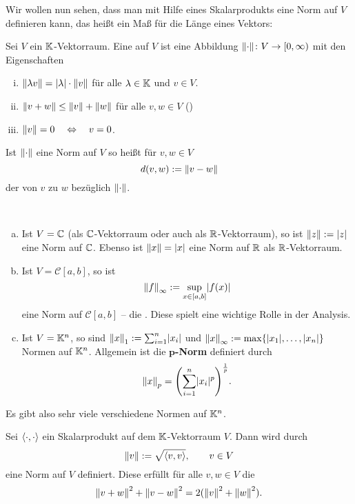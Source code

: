 Wir wollen nun sehen, dass man mit Hilfe eines Skalarprodukts eine Norm auf $V$ definieren kann, das heißt ein Maß für die Länge eines Vektors:

\begin{definition}[Norm]
	\label{def:3.5}
	Sei $V$ ein $\mathbb{K}$-Vektorraum.
	Eine  auf $V$ ist eine Abbildung $\lVert\cdot\rVert \colon V \rightarrow [0,\infty)$	mit den Eigenschaften
	\begin{enumerate}[(i)]
		\item $\left\lVert\lambda v\right\rVert = \lvert\lambda\rvert \cdot \left\lVert v\right\rVert$ für alle $\lambda \in \mathbb{K}$ und $v \in V$.
		\item $\left\lVert v+w\right\rVert \leq \left\lVert v\right\rVert + \left\lVert w\right\rVert$ für alle $v,w \in V$ ()
		\item $\left\lVert v\right\rVert = 0 \quad \Leftrightarrow \quad v = 0$.
	\end{enumerate}
	\newpage
	Ist $\left\lVert\cdot\right\rVert$ eine Norm auf $V$ so heißt für $v,w \in V$
	\[
		d(v,w) := \left\lVert v-w\right\rVert
	\]
	der  von $v$ zu $w$ bezüglich $\left\lVert\cdot\right\rVert$.
\end{definition}

\begin{beispiel}
	\label{bsp:3.6}
	\mbox{} \\[-1.4cm]
	\begin{enumerate}[(a)]
		\item Ist $V = \mathbb{C}$ (als $\mathbb{C}$-Vektorraum oder auch als $\mathbb{R}$-Vektorraum), so ist $\left\lVert z\right\rVert := \lvert z\rvert$ eine Norm auf $\mathbb{C}$.
		Ebenso ist $\left\lVert x\right\rVert = \lvert x\rvert$ eine Norm auf $\mathbb{R}$ als $\mathbb{R}$-Vektorraum.
		\item Ist $V = \mathcal{C}[a,b]$, so ist
		\[
			\left\lVert f\right\rVert_{\infty} := \sup_{x \in [a,b]} \lvert f(x)\rvert
		\]
		eine Norm auf $\mathcal{C}[a,b]$ -- die .
		Diese spielt eine wichtige Rolle in der Analysis.
		\item Ist $V = \mathbb{K}^n$, so sind $\left\lVert x\right\rVert_1 := \sum_{i=1}^{n} \lvert x_i\rvert$ und $\left\lVert x\right\rVert_\infty := \max\{ \lvert x_1\rvert,\dots,\lvert x_n\rvert\}$ Normen auf $\mathbb{K}^n$. Allgemein ist die $\mathbf{p}$\textbf{-Norm} definiert durch 
		\[
			\no{x}_p = \enb{\sum_{i=1}^{n} \abs{x_i}^p}^{\frac{1}{p}}.
		\]
	\end{enumerate}
	Es gibt also sehr viele verschiedene Normen auf $\mathbb{K}^n$.
\end{beispiel}

\begin{satz}
	\label{satz:3.7}
	Sei $\left\langle\cdot,\cdot\right\rangle$ ein Skalarprodukt auf dem $\mathbb{K}$-Vektorraum $V$.
	Dann wird durch
	\[
		\left\lVert v\right\rVert := \sqrt{\left\langle v,v\right\rangle}, \qquad v \in V
	\]
	eine Norm auf $V$ definiert.
	Diese erfüllt für alle $v,w \in V$ die 
	\[
		\left\lVert v+w\right\rVert^2 + \left\lVert v-w\right\rVert^2 = 2 (\left\lVert v\right\rVert^2 + \left\lVert w\right\rVert^2).
	\]
\end{satz}	
	
